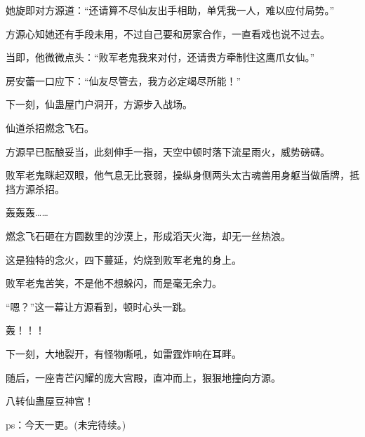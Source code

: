 \begin{this_body}
她旋即对方源道：“还请算不尽仙友出手相助，单凭我一人，难以应付局势。”

方源心知她还有手段未用，不过自己要和房家合作，一直看戏也说不过去。

当即，他微微点头：“败军老鬼我来对付，还请贵方牵制住这鹰爪女仙。”

房安蕾一口应下：“仙友尽管去，我方必定竭尽所能！”

下一刻，仙蛊屋门户洞开，方源步入战场。

仙道杀招燃念飞石。

方源早已酝酿妥当，此刻伸手一指，天空中顿时落下流星雨火，威势磅礴。

败军老鬼眯起双眼，他气息无比衰弱，操纵身侧两头太古魂兽用身躯当做盾牌，抵挡方源杀招。

轰轰轰……

燃念飞石砸在方圆数里的沙漠上，形成滔天火海，却无一丝热浪。

这是独特的念火，四下蔓延，灼烧到败军老鬼的身上。

败军老鬼苦笑，不是他不想躲闪，而是毫无余力。

“嗯？”这一幕让方源看到，顿时心头一跳。

轰！！！

下一刻，大地裂开，有怪物嘶吼，如雷霆炸响在耳畔。

随后，一座青芒闪耀的庞大宫殿，直冲而上，狠狠地撞向方源。

八转仙蛊屋豆神宫！

ps：今天一更。(未完待续。)

\end{this_body}

